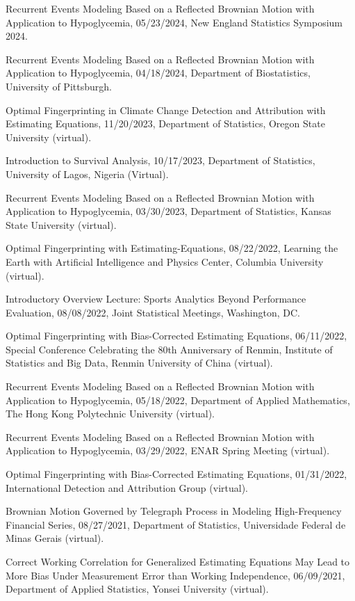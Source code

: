 \documentclass[Statistics]{vita}
\begin{document}
\begin{vita}
\begin{InvitedTalksLectures}
\begin{InvitedTalks}
  \item Recurrent Events Modeling Based on a Reflected Brownian Motion with Application to Hypoglycemia, 05/23/2024, New England Statistics Symposium 2024.
  \item Recurrent Events Modeling Based on a Reflected Brownian Motion with Application to Hypoglycemia, 04/18/2024, Department of Biostatistics, University of Pittsburgh.
  \item Optimal Fingerprinting in Climate Change Detection and Attribution with Estimating Equations, 11/20/2023, Department of Statistics, Oregon State University (virtual).
  \item Introduction to Survival Analysis, 10/17/2023, Department of Statistics, University of Lagos, Nigeria (Virtual).
  \item Recurrent Events Modeling Based on a Reflected Brownian Motion with Application to Hypoglycemia, 03/30/2023, Department of Statistics, Kansas State University (virtual).
  \item Optimal Fingerprinting with Estimating-Equations, 08/22/2022, Learning the Earth with Artificial Intelligence and Physics Center, Columbia University (virtual).
  \item Introductory Overview Lecture: Sports Analytics Beyond Performance Evaluation, 08/08/2022, Joint Statistical Meetings, Washington, DC.
  \item Optimal Fingerprinting with Bias-Corrected Estimating Equations, 06/11/2022, Special Conference Celebrating the 80th Anniversary of Renmin, Institute of Statistics and Big Data, Renmin University of China (virtual).
  \item Recurrent Events Modeling Based on a Reflected Brownian Motion with Application to Hypoglycemia, 05/18/2022, Department of Applied Mathematics, The Hong Kong Polytechnic University (virtual).
  \item Recurrent Events Modeling Based on a Reflected Brownian Motion with Application to Hypoglycemia, 03/29/2022, ENAR Spring Meeting (virtual).
  \item Optimal Fingerprinting with Bias-Corrected Estimating Equations, 01/31/2022, International Detection and Attribution Group (virtual).
  \item Brownian Motion Governed by Telegraph Process in Modeling High-Frequency Financial Series, 08/27/2021, Department of Statistics, Universidade Federal de Minas Gerais (virtual).
  \item Correct Working Correlation for Generalized Estimating Equations May Lead to More Bias Under Measurement Error than Working Independence, 06/09/2021, Department of Applied Statistics, Yonsei University (virtual).

\end{InvitedTalks}
\end{InvitedTalksLectures}
\end{vita}
\end{document}

